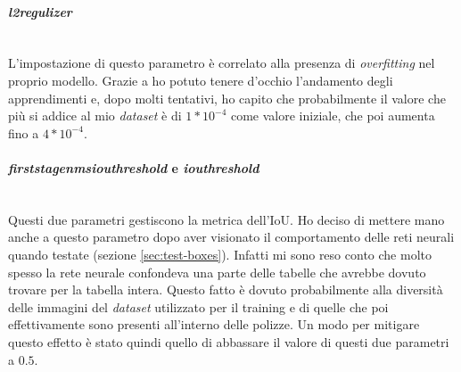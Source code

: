         \paragraph{\textit{l2\textunderscore regulizer}}
        ~\\L'impostazione di questo parametro è correlato alla presenza di \textit{overfitting} nel proprio modello. Grazie a  ho potuto tenere d'occhio l'andamento degli apprendimenti e, dopo molti tentativi, ho capito che probabilmente il valore che più si addice al mio \textit{dataset} è di $1*10^{-4}$ come valore iniziale, che poi aumenta fino a $4*10^{-4}$.
        \paragraph{\textit{first\textunderscore stage\textunderscore nms\textunderscore iou\textunderscore threshold} e \textit{iou\textunderscore threshold}}
        ~\\Questi due parametri gestiscono la metrica dell'IoU. Ho deciso di mettere mano anche a questo parametro dopo aver visionato il comportamento delle reti neurali quando testate (sezione \ref{sec:test-boxes}). Infatti mi sono reso conto che molto spesso la rete neurale confondeva una parte delle tabelle che avrebbe dovuto trovare per la tabella intera. Questo fatto è dovuto probabilmente alla diversità delle immagini del \textit{dataset} utilizzato per il training e di quelle che poi effettivamente sono presenti all'interno delle polizze. Un modo per mitigare questo effetto è stato quindi quello di abbassare il valore di questi due parametri a $0.5$.
